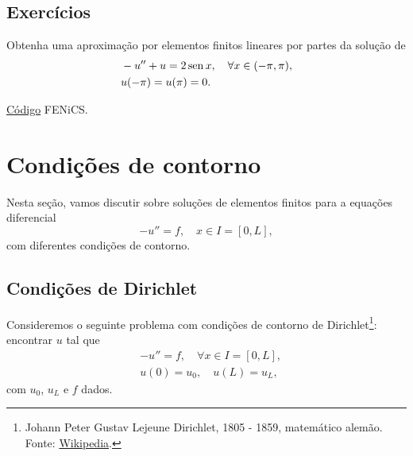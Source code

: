 \subsection*{Exercícios}

\begin{exer}\label{exer:dc}
  Obtenha uma aproximação por elementos finitos lineares por partes da solução de
  \begin{align}
    &-u'' + u = 2\operatorname{sen} x,\quad \forall x\in (-\pi, \pi),\\
    &u(-\pi)=u(\pi)=0.
  \end{align}
\end{exer}
\begin{resp}
  \ifispython
  \href{https://github.com/phkonzen/notas/blob/master/src/MetodoElementosFinitos/cap_mef1d/dados/exer_dc/exer_dc.py}{Código} FENiCS.
  \fi
\end{resp}


\section{Condições de contorno}\label{cap_mef1d_sec_cc}

Nesta seção, vamos discutir sobre soluções de elementos finitos para a equações diferencial
\begin{equation}
  -u'' = f,\quad x\in I=[0, L],
\end{equation}
com diferentes condições de contorno.

\subsection{Condições de Dirichlet}

Consideremos o seguinte problema com condições de contorno de Dirichlet\footnote{Johann Peter Gustav Lejeune Dirichlet, 1805 - 1859, matemático alemão. Fonte: \href{https://en.wikipedia.org/wiki/Peter_Gustav_Lejeune_Dirichlet}{Wikipedia}.}: encontrar $u$ tal que
\begin{align}
  &-u'' = f,\quad \forall x\in I=[0, L],\label{eq:cc_d_eq}\\
  &u(0) = u_0,\quad u(L) = u_L,\label{eq:cc_d_bc}
\end{align}
com $u_0$, $u_L$ e $f$ dados.

